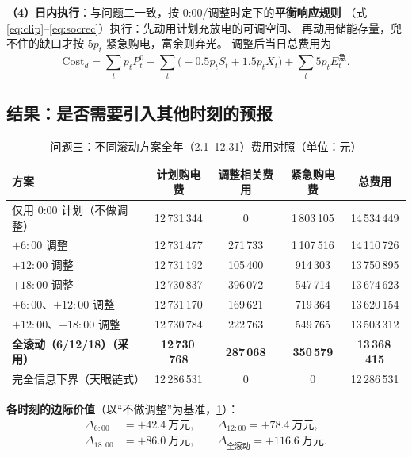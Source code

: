 \documentclass[12pt,a4paper,fontset=fandol]{ctexart}
\begin{document}
\textbf{（4\nobreak）日内执行}\nobreak：与问题二一致\nobreak，按 0:00/调整时定下的\textbf{平衡响应规则}
（式 \eqref{eq:clip}--\eqref{eq:socrec}\nobreak）执行\nobreak：先动用计划充放电的可调空间\nobreak、
再动用储能存量\nobreak，兜不住的缺口才按 $5p_t$ 紧急购电\nobreak，富余则弃光\nobreak。
调整后当日总费用为
\begin{equation}
\text{Cost}_d=\sum_t p_tP^0_t+\sum_t\Big(-0.5p_tS_t+1.5p_tX_t\Big)+\sum_t 5p_tE^{\text{急}}_t .
\label{eq:q3cost}
\end{equation}

\subsection{结果\nobreak：是否需要引入其他时刻的预报}

\begin{table}[htbp]
\centering
\caption{问题三\nobreak：不同滚动方案全年（2.1--12.31\nobreak）费用对照（单位\nobreak：元\nobreak）}
\label{tab:q3cmp}
\begin{tabular}{@{}lcccc@{}}
\toprule
方案 & 计划购电费 & 调整相关费用 & 紧急购电费 & 总费用 \\
\midrule
仅用 0:00 计划（不做调整\nobreak） & 12\,731\,344 & 0 & 1\,803\,105 & 14\,534\,449 \\
$+6{:}00$ 调整 & 12\,731\,477 & 271\,733 & 1\,107\,516 & 14\,110\,726 \\
$+12{:}00$ 调整 & 12\,731\,192 & 105\,400 & 914\,303 & 13\,750\,895 \\
$+18{:}00$ 调整 & 12\,730\,837 & 396\,072 & 547\,714 & 13\,674\,623 \\
$+6{:}00$\nobreak、$+12{:}00$ 调整 & 12\,731\,170 & 169\,621 & 719\,364 & 13\,620\,154 \\
$+12{:}00$\nobreak、$+18{:}00$ 调整 & 12\,730\,784 & 222\,763 & 549\,765 & 13\,503\,312 \\
\textbf{全滚动（6/12/18\nobreak）（采用\nobreak）} & \textbf{12\,730\,768} & \textbf{287\,068} & \textbf{350\,579} & \textbf{13\,368\,415} \\
完全信息下界（天眼链式\nobreak） & 12\,286\,531 & 0 & 0 & 12\,286\,531 \\
\bottomrule
\end{tabular}
\end{table}

\textbf{各时刻的边际价值}（以“不做调整\nobreak”为基准\nobreak，\cref{tab:q3cmp}\nobreak）\nobreak：
\begin{equation}
\begin{aligned}
\Delta_{6:00}&=+42.4\ \text{万元},\qquad
\Delta_{12:00}=+78.4\ \text{万元},\\
\Delta_{18:00}&=+86.0\ \text{万元},\qquad
\Delta_{\text{全滚动}}=+116.6\ \text{万元}.
\end{aligned}
\label{eq:marginal}
\end{equation}
\end{document}
